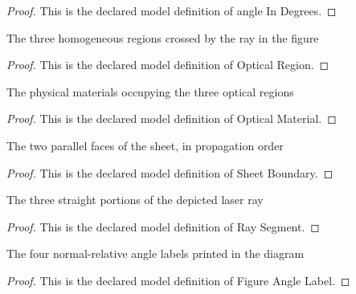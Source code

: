 \begin{proof}
  This is the declared model definition of angle In Degrees.
\end{proof}
\begin{definition}
  \label{def:physics:phyx-mini-0155:phyxminiproblems-problemphyxmini0155-opticalregion}
  The three homogeneous regions crossed by the ray in the figure
\end{definition}
\begin{proof}
  This is the declared model definition of Optical Region.
\end{proof}
\begin{definition}
  \label{def:physics:phyx-mini-0155:phyxminiproblems-problemphyxmini0155-opticalmaterial}
  The physical materials occupying the three optical regions
\end{definition}
\begin{proof}
  This is the declared model definition of Optical Material.
\end{proof}
\begin{definition}
  \label{def:physics:phyx-mini-0155:phyxminiproblems-problemphyxmini0155-sheetboundary}
  The two parallel faces of the sheet, in propagation order
\end{definition}
\begin{proof}
  This is the declared model definition of Sheet Boundary.
\end{proof}
\begin{definition}
  \label{def:physics:phyx-mini-0155:phyxminiproblems-problemphyxmini0155-raysegment}
  The three straight portions of the depicted laser ray
\end{definition}
\begin{proof}
  This is the declared model definition of Ray Segment.
\end{proof}
\begin{definition}
  \label{def:physics:phyx-mini-0155:phyxminiproblems-problemphyxmini0155-figureanglelabel}
  The four normal-relative angle labels printed in the diagram
\end{definition}
\begin{proof}
  This is the declared model definition of Figure Angle Label.
\end{proof}
